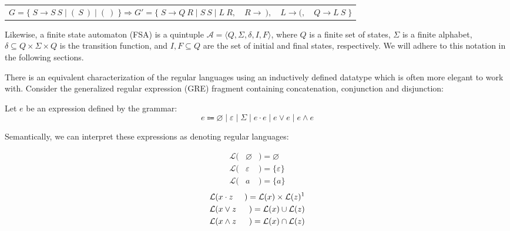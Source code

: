 \documentclass[sigplan,review,acmsmall,nonacm,screen,anonymous]{acmart}\settopmatter{printfolios=false,printccs=false,printacmref=false}
\begin{document}
\begin{table}[H]
  \begin{tabular}{llll}
    $G = \big\{\;S \rightarrow S\:S \mid (\:S\:) \mid (\:)\;\big\} \Longrightarrow G' = \big\{\;S\rightarrow Q\:R \mid S\:S \mid L\:R,$ & $R \rightarrow\:),$ & $L \rightarrow (,$ & $Q\rightarrow L\:S\;\big\}$
  \end{tabular}
\end{table}\vspace{-8pt}

Likewise, a finite state automaton (FSA) is a quintuple $\mathcal{A} = \langle Q, \Sigma, \delta, I, F\rangle$, where $Q$ is a finite set of states, $\Sigma$ is a finite alphabet, $\delta \subseteq Q \times \Sigma \times Q$ is the transition function, and $I, F \subseteq Q$ are the set of initial and final states, respectively. We will adhere to this notation in the following sections.

There is an equivalent characterization of the regular languages using an inductively defined datatype which is often more elegant to work with. Consider the generalized regular expression (GRE) fragment containing concatenation, conjunction and disjunction:

\begin{definition}
  Let \( e \) be an expression defined by the grammar:
  \[
    e \Coloneqq \varnothing \mid \varepsilon \mid \Sigma \mid e \cdot e \mid e \lor e \mid e \land e
  \]

  Semantically, we can interpret these expressions as denoting regular languages:\vspace{-0.8cm}

  \setlength{\columnseprule}{0pt}
  \setlength{\columnsep}{-3cm}
  \begin{multicols}{2}
    \begin{eqnarray*}
      \mathcal{L}(& \varnothing & ) = \varnothing \\
      \mathcal{L}(& \varepsilon & ) = \{\varepsilon\} \\
      \mathcal{L}(& a           & ) = \{a\}
    \end{eqnarray*} \break\vspace{-0.45cm}
    \begin{eqnarray*}
      \mathcal{L}(& x\cdot z & ) = \mathcal{L}(x) \times \mathcal{L}(z)\text{\footnotemark}\\
      \mathcal{L}(& x\vee  z & ) = \mathcal{L}(x) \cup   \mathcal{L}(z)\\
      \mathcal{L}(& x\land z & ) = \mathcal{L}(x) \cap   \mathcal{L}(z)
    \end{eqnarray*}
  \end{multicols}
\end{definition}\vspace{-0.2cm}
\end{document}
